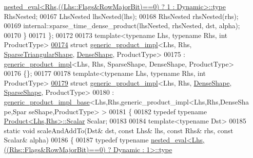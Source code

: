 \begin{DoxyCode}
      \hyperlink{class_eigen_1_1internal_1_1_tensor_lazy_evaluator_writable}{nested\_eval<Rhs,((Lhs::Flags&RowMajorBit)==0) ? 1 : Dynamic>::type}
       RhsNested;
00167     LhsNested lhsNested(lhs);
00168     RhsNested rhsNested(rhs);
00169     internal::sparse\_time\_dense\_product(lhsNested, rhsNested, dst, alpha);
00170   \}
00171 \};
00172 
00173 \textcolor{keyword}{template}<\textcolor{keyword}{typename} Lhs, \textcolor{keyword}{typename} Rhs, \textcolor{keywordtype}{int} ProductType>
\hyperlink{struct_eigen_1_1internal_1_1generic__product__impl_3_01_lhs_00_01_rhs_00_01_sparse_triangular_she6f06f29bc806fe3ce6ddd06da00c291}{00174} \textcolor{keyword}{struct }\hyperlink{struct_eigen_1_1internal_1_1generic__product__impl}{generic\_product\_impl}<Lhs, Rhs, \hyperlink{struct_eigen_1_1internal_1_1_sparse_triangular_shape}{SparseTriangularShape}, 
      \hyperlink{struct_eigen_1_1_dense_shape}{DenseShape}, ProductType>
00175   : \hyperlink{struct_eigen_1_1internal_1_1generic__product__impl}{generic\_product\_impl}<Lhs, Rhs, SparseShape, DenseShape, ProductType>
00176 \{\};
00177 
00178 \textcolor{keyword}{template}<\textcolor{keyword}{typename} Lhs, \textcolor{keyword}{typename} Rhs, \textcolor{keywordtype}{int} ProductType>
\hyperlink{struct_eigen_1_1internal_1_1generic__product__impl_3_01_lhs_00_01_rhs_00_01_dense_shape_00_01_sp21121e5deb0bbd0b6e9032984c439886}{00179} \textcolor{keyword}{struct }\hyperlink{struct_eigen_1_1internal_1_1generic__product__impl}{generic\_product\_impl}<Lhs, Rhs, \hyperlink{struct_eigen_1_1_dense_shape}{DenseShape}, 
      \hyperlink{struct_eigen_1_1_sparse_shape}{SparseShape}, ProductType>
00180   : \hyperlink{struct_eigen_1_1internal_1_1generic__product__impl__base}{generic\_product\_impl\_base}<Lhs,Rhs,generic\_product\_impl<Lhs,Rhs,DenseShape,Spar
      seShape,ProductType> >
00181 \{
00182   \textcolor{keyword}{typedef} \textcolor{keyword}{typename} \hyperlink{group___core___module_class_eigen_1_1_product}{Product<Lhs,Rhs>::Scalar} Scalar;
00183   
00184   \textcolor{keyword}{template}<\textcolor{keyword}{typename} Dst>
00185   \textcolor{keyword}{static} \textcolor{keywordtype}{void} scaleAndAddTo(Dst& dst, \textcolor{keyword}{const} Lhs& lhs, \textcolor{keyword}{const} Rhs& rhs, \textcolor{keyword}{const} Scalar& alpha)
00186   \{
00187     \textcolor{keyword}{typedef} \textcolor{keyword}{typename} 
      \hyperlink{class_eigen_1_1internal_1_1_tensor_lazy_evaluator_writable}{nested\_eval<Lhs,((Rhs::Flags&RowMajorBit)==0) ? Dynamic : 1>::type}

\end{DoxyCode}
